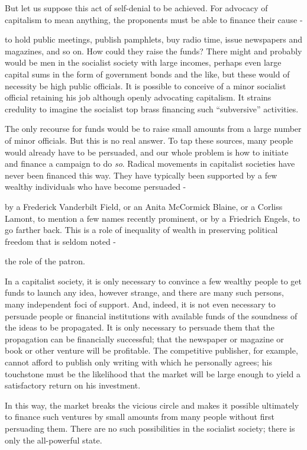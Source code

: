 \documentclass[11pt,openany]{book}
\begin{document}
But let us suppose this act of self-denial to be achieved. For advocacy of capitalism to mean anything, the proponents must be able to finance their cause -

to hold public meetings, publish pamphlets, buy radio time, issue newspapers and magazines, and so on. How could they raise the funds? There might and probably would be men in the socialist society with large incomes, perhaps even large capital sums in the form of government bonds and the like, but these would of necessity be high public officials. It is possible to conceive of a minor socialist official retaining his job although openly advocating capitalism. It strains credulity to imagine the socialist top brass financing such ``subversive'' activities.

The only recourse for funds would be to raise small amounts from a large number of minor officials. But this is no real answer. To tap these sources, many people would already have to be persuaded, and our whole problem is how to initiate and finance a campaign to do \emph{so}. Radical movements in capitalist societies have never been financed this way. They have typically been supported by a few wealthy individuals who have become persuaded -

by a Frederick Vanderbilt Field, or an Anita McCormick Blaine, or a Corliss Lamont, to mention a few names recently prominent, or by a Friedrich Engels, to go farther back. This is a role of inequality of wealth in preserving political freedom that is seldom noted -

the role of the patron.

In a capitalist society, it is only necessary to convince a few wealthy people to get funds to launch any idea, however strange, and there are many such persons, many independent foci of support. And, indeed, it is not even necessary to persuade people or financial institutions with available funds of the soundness of the ideas to be propagated. It is only necessary to persuade them that the propagation can be financially successful; that the newspaper or magazine or book or other venture will be profitable. The competitive publisher, for example, cannot afford to publish only writing with which he personally agrees; his touchstone must be the likelihood that the market will be large enough to yield a satisfactory return on his investment.

In this way, the market breaks the vicious circle and makes it possible ultimately to finance such ventures by small amounts from many people without first persuading them. There are no such possibilities in the socialist society; there is only the all-powerful state.
\end{document}
